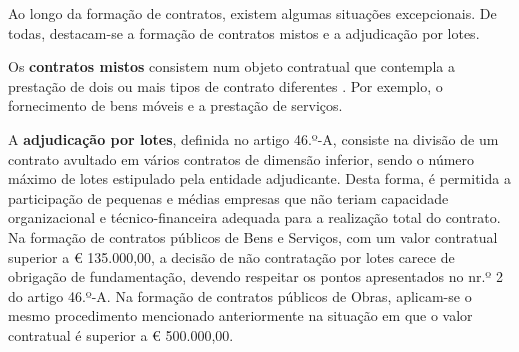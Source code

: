 Ao longo da formação de contratos, existem algumas situações excepcionais. De todas, destacam-se a formação de contratos mistos e a adjudicação por lotes.

Os \textbf{contratos mistos} consistem num objeto contratual que contempla a prestação de dois ou mais tipos de contrato diferentes \cite{mistos}. Por exemplo, o fornecimento de bens móveis e a prestação de serviços.

A \textbf{adjudicação por lotes}, definida no artigo 46.º-A, consiste na divisão de um contrato avultado em vários contratos de dimensão inferior, sendo o número máximo de lotes estipulado pela entidade adjudicante. Desta forma, é permitida a participação de pequenas e médias empresas que não teriam capacidade organizacional e técnico-financeira adequada para a realização total do contrato. Na formação de contratos públicos de Bens e Serviços, com um valor contratual superior a € 135.000,00, a decisão de não contratação por lotes carece de obrigação de fundamentação, devendo respeitar os pontos apresentados no nr.º 2 do artigo 46.º-A. Na formação de contratos públicos de Obras, aplicam-se o mesmo procedimento mencionado anteriormente na situação em que o valor contratual é superior a € 500.000,00. 


